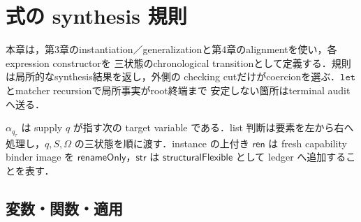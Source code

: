 \section{式の synthesis 規則}

本章は，第3章のinstantiation／generalizationと第4章のalignmentを使い，各expression constructorを
三状態のchronological transitionとして定義する．規則は局所的なsynthesis結果を返し，外側の
checking cutだけがcoercionを選ぶ．$\mathtt{let}$とmatcher recursionで局所事実がroot終端まで
安定しない箇所はterminal auditへ送る．

$\alpha_{q_\tau}$ は supply $q$ が指す次の target variable である．list 判断は要素を左から右へ
処理し，$q,S,\Omega$ の三状態を順に渡す．instance の上付き $\mathsf{ren}$ は fresh capability
binder image を $\mathsf{renameOnly}$，$\mathsf{str}$ は $\mathsf{structuralFlexible}$ として ledger
へ追加することを表す．

\subsection{変数・関数・適用}

